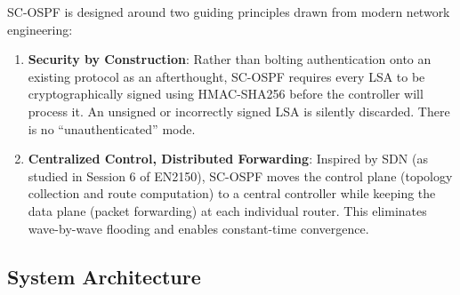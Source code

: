 \documentclass[12pt,a4paper]{article}
\begin{document}
SC-OSPF is designed around two guiding principles drawn from modern network
engineering:

\begin{enumerate}[itemsep=5pt]
  \item \textbf{Security by Construction}: Rather than bolting authentication
  onto an existing protocol as an afterthought, SC-OSPF requires every LSA to be
  cryptographically signed using HMAC-SHA256 before the controller will process
  it. An unsigned or incorrectly signed LSA is silently discarded. There is no
  ``unauthenticated'' mode.

  \item \textbf{Centralized Control, Distributed Forwarding}: Inspired by SDN
  (as studied in Session 6 of EN2150), SC-OSPF moves the control plane
  (topology collection and route computation) to a central controller while
  keeping the data plane (packet forwarding) at each individual router. This
  eliminates wave-by-wave flooding and enables constant-time convergence.
\end{enumerate}

\subsection{System Architecture}
\end{document}
